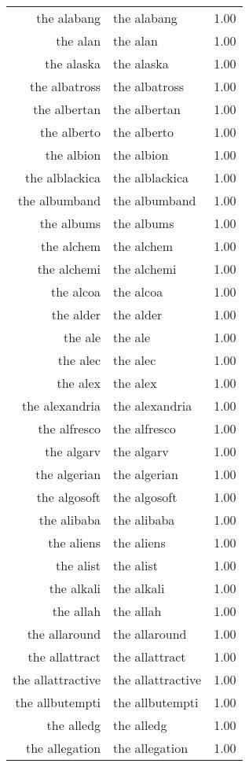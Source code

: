 \begin{table}[ht]
\begin{tabular}{rlr}
  the alabang & the alabang & 1.00 \\ 
  the alan & the alan & 1.00 \\ 
  the alaska & the alaska & 1.00 \\ 
  the albatross & the albatross & 1.00 \\ 
  the albertan & the albertan & 1.00 \\ 
  the alberto & the alberto & 1.00 \\ 
  the albion & the albion & 1.00 \\ 
  the alblackica & the alblackica & 1.00 \\ 
  the albumband & the albumband & 1.00 \\ 
  the albums & the albums & 1.00 \\ 
  the alchem & the alchem & 1.00 \\ 
  the alchemi & the alchemi & 1.00 \\ 
  the alcoa & the alcoa & 1.00 \\ 
  the alder & the alder & 1.00 \\ 
  the ale & the ale & 1.00 \\ 
  the alec & the alec & 1.00 \\ 
  the alex & the alex & 1.00 \\ 
  the alexandria & the alexandria & 1.00 \\ 
  the alfresco & the alfresco & 1.00 \\ 
  the algarv & the algarv & 1.00 \\ 
  the algerian & the algerian & 1.00 \\ 
  the algosoft & the algosoft & 1.00 \\ 
  the alibaba & the alibaba & 1.00 \\ 
  the aliens & the aliens & 1.00 \\ 
  the alist & the alist & 1.00 \\ 
  the alkali & the alkali & 1.00 \\ 
  the allah & the allah & 1.00 \\ 
  the allaround & the allaround & 1.00 \\ 
  the allattract & the allattract & 1.00 \\ 
  the allattractive & the allattractive & 1.00 \\ 
  the allbutempti & the allbutempti & 1.00 \\ 
  the alledg & the alledg & 1.00 \\ 
  the allegation & the allegation & 1.00 \\ 

\end{tabular}
\end{table}
